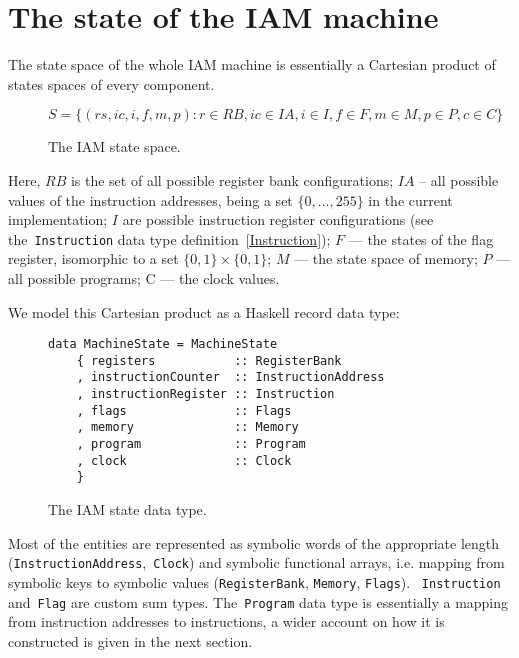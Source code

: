 \section{The state of the IAM machine}

The state space of the whole IAM machine is essentially a Cartesian product of states spaces
of every component.

\begin{figure}[H]
\centering
$S = \{(rs, ic, i, f, m, p) : r \in RB, ic \in IA, i \in I, f \in F, m \in M, p \in P, c \in C\}$
\label{stateSpace}
\caption{The IAM state space.}
\end{figure}

Here, $RB$ is the set of all possible register bank configurations; $IA$ -- all possible values
of the instruction addresses, being a set $\{0,\ldots,255\}$ in the current implementation;
$I$ are possible instruction register configurations (see the~\texttt{Instruction} data type definition~\ref{Instruction}); $F$ --- the states of the flag register, isomorphic to a set
$\{0,1\} \times \{0,1\}$; $M$ --- the state space of memory; $P$ --- all possible programs; C --- the clock values.

We model this Cartesian product as a Haskell record data type:

\begin{figure}[H]
\begin{verbatim}
data MachineState = MachineState
    { registers           :: RegisterBank
    , instructionCounter  :: InstructionAddress
    , instructionRegister :: Instruction
    , flags               :: Flags
    , memory              :: Memory
    , program             :: Program
    , clock               :: Clock
    }
\end{verbatim}
\label{state}
\caption{The IAM state data type.}
\end{figure}

Most of the entities are represented as symbolic words of the appropriate
length (\texttt{InstructionAddress},~\texttt{Clock}) and
symbolic functional arrays, i.e. mapping from symbolic keys to symbolic
values (\texttt{RegisterBank}, \texttt{Memory}, \texttt{Flags}).
~\texttt{Instruction} and~\texttt{Flag} are custom sum types.
The~\texttt{Program} data type is essentially a mapping from instruction addresses to
instructions, a wider account on how it is constructed is given in the next section.